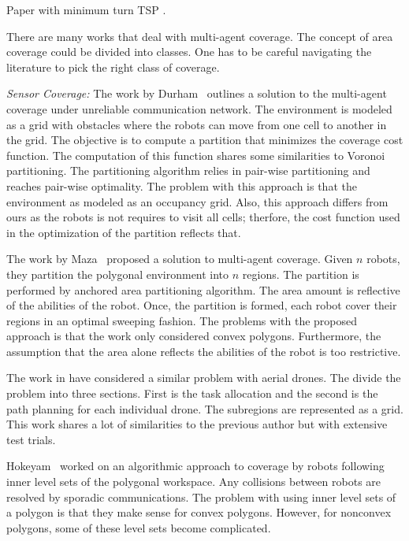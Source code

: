 \documentclass[../main.tex]{subfiles}
\begin{document}
Paper with minimum turn TSP\cite{wagner2001approximation}
\cite{arkin2005optimal}.

There are many works that deal with multi-agent coverage. The concept of area coverage could be divided into classes. One has to be careful navigating the literature to pick the right class of coverage.

\textit{Sensor Coverage:}
The work by Durham~\cite{durham2012discrete} outlines a solution to the  multi-agent coverage under unreliable communication network. The environment is modeled as a grid with obstacles where the robots can move from one cell to another in the grid. The objective is to compute a partition that minimizes the coverage cost function. The computation of this function shares some similarities to Voronoi partitioning. The partitioning algorithm relies in pair-wise partitioning and reaches pair-wise optimality. The problem with this approach is that the environment as modeled as an occupancy grid. Also, this approach differs from ours as the robots is not requires to visit all cells; therfore, the cost function used in the optimization of the partition reflects that.

The work by Maza~\cite{maza2007multiple} proposed a solution to multi-agent coverage. Given $n$ robots, they partition the polygonal environment into $n$ regions. The partition is performed by anchored area partitioning algorithm. The area amount is reflective of the abilities of the robot. Once, the partition is formed, each robot cover their regions in an optimal sweeping fashion. The problems with the proposed approach is that the work only considered convex polygons. Furthermore, the assumption that the area alone reflects the abilities of the robot is too restrictive.

The work in \cite{barrientos2011aerial} have considered a similar problem with aerial drones. The divide the problem into three sections. First is the task allocation and the second is the path planning for each individual drone. The subregions are represented as a grid. This work shares a lot of similarities to the previous author but with extensive test trials.

Hokeyam~\cite{hokayem2007dynamic} worked on an algorithmic approach to coverage by robots following inner level sets of the polygonal workspace. Any collisions between robots are resolved by sporadic communications. The problem with using inner level sets of a polygon is that they make sense for convex polygons. However, for nonconvex polygons, some of these level sets become complicated. 
\end{document}
